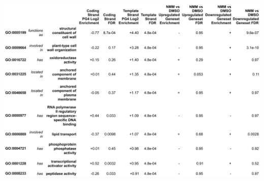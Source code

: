 \documentclass[12pt,a4paper,]{report}
\let\origfigure=\figure
\let\endorigfigure=\endfigure
\renewenvironment{figure}[1][2] {
    \expandafter\origfigure\expandafter[H]
} {
    \endorigfigure
}
\begin{document}
\newpage

\begin{figure}[htbp]
\centering
\includegraphics[width=\textwidth,height=562pt,keepaspectratio]{chapter_6/figures/g4_nmm_gene_ontology_table.png}
\caption[Gene Ontology groups enriched in template stranded PG4s]{\textbf{Gene   Ontology   groups   enriched   in   template   stranded   PG4s}   Table   showing   the   top   ten   Gene   Ontology   groups   most   enriched   for   exonic   PG4s   compared   to   null   distribution.   The   top   two   groups,   both   containing   genes   involved   in   cell   wall   structure   and   organisation,   are   also   enriched   for   genes   downregulated   by   NMM.   \label{go_table}}
\end{figure}

\newpage
\end{document}
